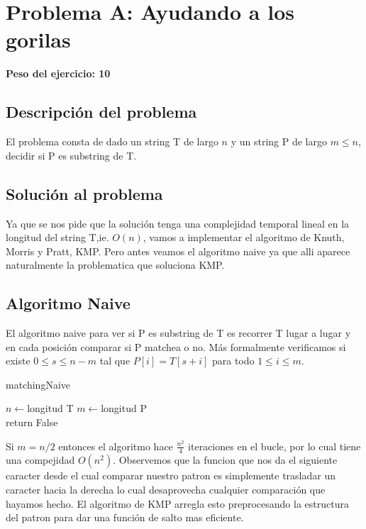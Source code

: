 \newpage{}
\section{Problema A: Ayudando a los gorilas}
\textbf{Peso del ejercicio: 10}
\subsection{Descripción del problema}
	El problema consta de dado un string T de largo $n$ y un string P de 
	largo $m\leq n$, decidir si P es substring de T.
	
\subsection{Solución al problema}
	Ya que se nos pide que la soluci\'on tenga una complejidad temporal
	lineal en la longitud del string T,ie. $O(n)$, vamos a implementar el algoritmo
	de Knuth, Morris y Pratt, KMP. Pero antes veamos el algoritmo naive
	ya que alli aparece naturalmente la problematica que soluciona KMP.
	
\subsection{Algoritmo Naive}
	El algoritmo naive para ver si P es substring de T es recorrer
	T lugar a lugar y en cada posici\'on comparar si P matchea o no. M\'as
	formalmente verificamos si existe $0\leq s \leq n-m$ tal que 
	$P[i]=T[s+i]$ para todo $1\leq i \leq m$.
	
	\begin{algorithm}
		\caption{matchingNaive}
		\BlankLine
	
		$n\leftarrow$longitud T\;
		$m\leftarrow$longitud P\\
		return False\;
	\end{algorithm}
	
	
	Si $m=n/2$ entonces el algoritmo hace $\frac{n^2}{4}$ iteraciones
	en el bucle, por lo cual tiene una compejidad $O(n^2)$. Observemos
	que la funcion que nos da el siguiente caracter desde el cual
	comparar nuestro patron es simplemente trasladar un caracter hacia
	la derecha lo cual desaprovecha cualquier comparaci\'on que hayamos
	hecho. El algoritmo de KMP arregla esto preprocesando 
	la estructura del patron para dar una funci\'on de salto mas eficiente.


